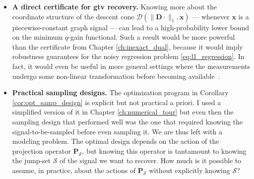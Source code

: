 \begin{itemize}
    \item \textbf{A direct certificate for \acrshort{gtv} recovery.} Knowing more about the coordinate structure of the descent cone $\mathcal{D} \left ( \|\mathbf{D} \cdot\|_1 , \mathbf{x} \right )$ --- whenever $\mathbf{x}$ is a piecewise-constant graph signal --- can lead to a high-probability lower bound on the minimum $q$-gain functional. Such a result would be more powerful than the certificate from Chapter \ref{ch:inexact_dual}, because it would imply robustness guarantees for the noisy regression problem \eqref{eq:l1_regression}. In fact, it would even be useful in more general settings where the measurements undergo some non-linear transformation before becoming available~\cite{plan2016}.
    \item \textbf{Practical sampling designs.} The optimization program in Corollary \ref{cor:opt_samp_design} is explicit but not practical a priori. I used a simplified version of it in Chapter \ref{ch:numerical_tour} but even then the sampling design that performed well was the one that required knowing the signal-to-be-sampled before even sampling it. We are thus left with a modeling problem. The optimal design depends on the action of the projection operator $\mathbf{P}_{\mathcal{S}}$, but knowing this operator is tantamount to knowing the jump-set $\mathcal{S}$ of the signal we want to recover. How much is it possible to assume, in practice, about the actions of $\mathbf{P}_{\mathcal{S}}$ without explicitly knowing $\mathcal{S}$?
\end{itemize}

